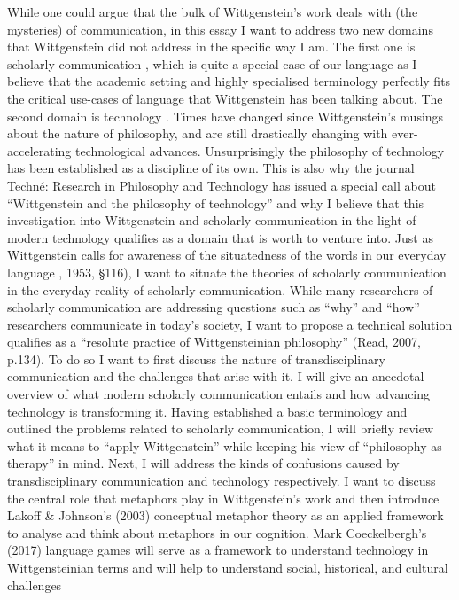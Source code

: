 While one could argue that the bulk of Wittgenstein’s work deals with
(the mysteries) of communication, in this essay I want to address two
new domains that Wittgenstein did not address in the specific way I am.
The first one is scholarly communication , which is quite a
special case of our language as I believe that the academic setting and
highly specialised terminology perfectly fits the critical use-cases of
language that Wittgenstein has been talking about. The second domain is
technology . Times have changed since Wittgenstein’s musings about
the nature of philosophy, and are still drastically changing with
ever-accelerating technological advances. Unsurprisingly the philosophy
of technology has been established as a discipline of its own. This is
also why the journal Techné: Research in Philosophy and
Technology has issued a special call about “Wittgenstein and the
philosophy of technology” and why I believe that this investigation
into Wittgenstein and scholarly communication in the light of modern
technology qualifies as a domain that is worth to venture into. Just as
Wittgenstein calls for awareness of the situatedness of the words in our
everyday language \cite{Wittgenstein1953}, 1953, §116), I want to situate the
theories of scholarly communication in the everyday reality of scholarly
communication. While many researchers of scholarly communication are
addressing questions such as “why” and “how” researchers communicate
in today’s society, I want to propose a technical solution qualifies as
a “resolute practice of Wittgensteinian philosophy” (Read, 2007,
p.134). To do so I want to first discuss the nature of transdisciplinary
communication and the challenges that arise with it. I will give an
anecdotal overview of what modern scholarly communication entails and
how advancing technology is transforming it. Having established a basic
terminology and outlined the problems related to scholarly
communication, I will briefly review what it means to “apply
Wittgenstein” while keeping his view of “philosophy as therapy” in
mind. Next, I will address the kinds of confusions caused by
transdisciplinary communication and technology respectively. I want to
discuss the central role that metaphors play in Wittgenstein’s work and
then introduce Lakoff & Johnson’s (2003) conceptual metaphor
theory as an applied framework to analyse and think about metaphors in
our cognition. Mark Coeckelbergh’s (2017) language games will
serve as a framework to understand technology in Wittgensteinian terms
and will help to understand social, historical, and cultural challenges
